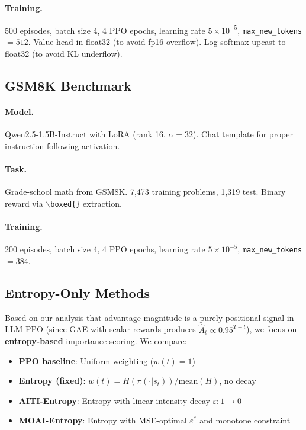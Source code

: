 \documentclass[11pt,a4paper]{article}
\begin{document}
\paragraph{Training.} 500 episodes, batch size 4, 4 PPO epochs, learning rate $5 \times 10^{-5}$, \texttt{max\_new\_tokens}$=512$. Value head in float32 (to avoid fp16 overflow). Log-softmax upcast to float32 (to avoid KL underflow).

\subsection{GSM8K Benchmark}

\paragraph{Model.} Qwen2.5-1.5B-Instruct with LoRA (rank 16, $\alpha = 32$). Chat template for proper instruction-following activation.

\paragraph{Task.} Grade-school math from GSM8K. 7,473 training problems, 1,319 test. Binary reward via $\backslash$\texttt{boxed\{\}} extraction.

\paragraph{Training.} 200 episodes, batch size 4, 4 PPO epochs, learning rate $5 \times 10^{-5}$, \texttt{max\_new\_tokens}$=384$.

\subsection{Entropy-Only Methods}

Based on our analysis that advantage magnitude is a purely positional signal in LLM PPO (since GAE with scalar rewards produces $\hat{A}_t \propto 0.95^{T-t}$), we focus on \textbf{entropy-based} importance scoring. We compare:
\begin{itemize}
    \item \textbf{PPO baseline}: Uniform weighting ($w(t) = 1$)
    \item \textbf{Entropy (fixed)}: $w(t) = H(\pi(\cdot|s_t)) / \text{mean}(H)$, no decay
    \item \textbf{AITI-Entropy}: Entropy with linear intensity decay $\varepsilon: 1 \to 0$
    \item \textbf{MOAI-Entropy}: Entropy with MSE-optimal $\varepsilon^*$ and monotone constraint
\end{itemize}
\end{document}
